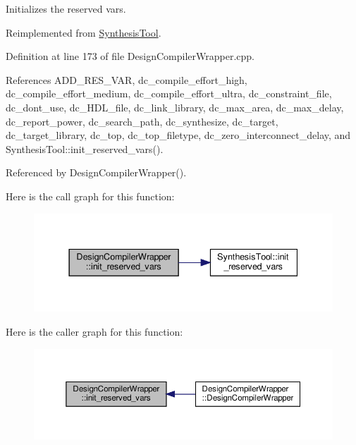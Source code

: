 Initializes the reserved vars. 



Reimplemented from \hyperlink{classSynthesisTool_a85b4a4fa0cc60e5325a79d7479c505b7}{Synthesis\+Tool}.



Definition at line 173 of file Design\+Compiler\+Wrapper.\+cpp.



References A\+D\+D\+\_\+\+R\+E\+S\+\_\+\+V\+AR, dc\+\_\+compile\+\_\+effort\+\_\+high, dc\+\_\+compile\+\_\+effort\+\_\+medium, dc\+\_\+compile\+\_\+effort\+\_\+ultra, dc\+\_\+constraint\+\_\+file, dc\+\_\+dont\+\_\+use, dc\+\_\+\+H\+D\+L\+\_\+file, dc\+\_\+link\+\_\+library, dc\+\_\+max\+\_\+area, dc\+\_\+max\+\_\+delay, dc\+\_\+report\+\_\+power, dc\+\_\+search\+\_\+path, dc\+\_\+synthesize, dc\+\_\+target, dc\+\_\+target\+\_\+library, dc\+\_\+top, dc\+\_\+top\+\_\+filetype, dc\+\_\+zero\+\_\+interconnect\+\_\+delay, and Synthesis\+Tool\+::init\+\_\+reserved\+\_\+vars().



Referenced by Design\+Compiler\+Wrapper().

Here is the call graph for this function\+:
\nopagebreak
\begin{figure}[H]
\begin{center}
\leavevmode
\includegraphics[width=337pt]{d5/d55/classDesignCompilerWrapper_ac1adc09c852d3103b975cf53240b36ea_cgraph}
\end{center}
\end{figure}
Here is the caller graph for this function\+:
\nopagebreak
\begin{figure}[H]
\begin{center}
\leavevmode
\includegraphics[width=350pt]{d5/d55/classDesignCompilerWrapper_ac1adc09c852d3103b975cf53240b36ea_icgraph}
\end{center}
\end{figure}
\mbox{\label{classDesignCompilerWrapper_a6fa8c9faab67d5c8d627562108c1c34d}} 
